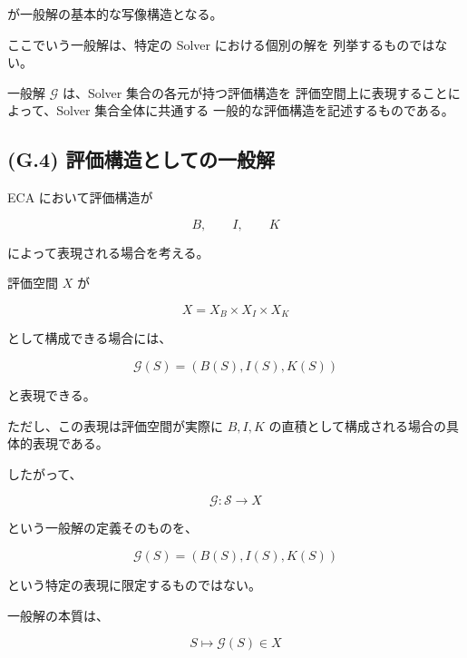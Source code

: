 \documentclass[a4paper,11pt]{article}
\begin{document}
が一般解の基本的な写像構造となる。

ここでいう一般解は、特定の Solver における個別の解を
列挙するものではない。

一般解 $\mathcal{G}$ は、Solver 集合の各元が持つ評価構造を
評価空間上に表現することによって、Solver 集合全体に共通する
一般的な評価構造を記述するものである。


\subsection{(G.4) 評価構造としての一般解}
\label{subsec:G4}

ECA において評価構造が

\begin{equation}
    B,\qquad I,\qquad K
\end{equation}

によって表現される場合を考える。

評価空間 $X$ が

\begin{equation}
    X
    =
    X_B\times X_I\times X_K
\end{equation}

として構成できる場合には、

\begin{equation}
    \boxed{
        \mathcal{G}(S)
        =
        \left(
            B(S),
            I(S),
            K(S)
        \right)
    }
    \label{eq:G-BIK}
\end{equation}

と表現できる。

ただし、この表現は評価空間が実際に
$B,I,K$ の直積として構成される場合の具体的表現である。

したがって、

\begin{equation}
    \mathcal{G}:
    \mathcal{S}\longrightarrow X
\end{equation}

という一般解の定義そのものを、

\begin{equation}
    \mathcal{G}(S)
    =
    \left(B(S),I(S),K(S)\right)
\end{equation}

という特定の表現に限定するものではない。

一般解の本質は、

\begin{equation}
    \boxed{
        S\longmapsto\mathcal{G}(S)\in X
    }
\end{equation}
\end{document}
